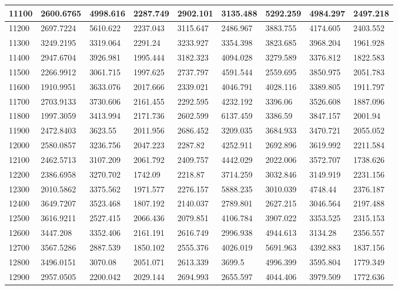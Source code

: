 \begin{table}[]
{\begin{tabular}{|l|l|l|l|l|l|l|l|l|}
11100 & 2600.6765 & 4998.616 & 2287.749 & 2902.101 & 3135.488 & 5292.259 & 4984.297 & 2497.218 \\ \hline
11200 & 2697.7224 & 5610.622 & 2237.043 & 3115.647 & 2486.967 & 3883.755 & 4174.605 & 2403.552 \\ \hline
11300 & 3249.2195 & 3319.064 & 2291.24 & 3233.927 & 3354.398 & 3823.685 & 3968.204 & 1961.928 \\ \hline
11400 & 2947.6704 & 3926.981 & 1995.444 & 3182.323 & 4094.028 & 3279.589 & 3376.812 & 1822.583 \\ \hline
11500 & 2266.9912 & 3061.715 & 1997.625 & 2737.797 & 4591.544 & 2559.695 & 3850.975 & 2051.783 \\ \hline
11600 & 1910.9951 & 3633.076 & 2017.666 & 2339.021 & 4046.791 & 4028.116 & 3389.805 & 1911.797 \\ \hline
11700 & 2703.9133 & 3730.606 & 2161.455 & 2292.595 & 4232.192 & 3396.06 & 3526.608 & 1887.096 \\ \hline
11800 & 1997.3059 & 3413.994 & 2171.736 & 2602.599 & 6137.459 & 3386.59 & 3847.157 & 2001.94 \\ \hline
11900 & 2472.8403 & 3623.55 & 2011.956 & 2686.452 & 3209.035 & 3684.933 & 3470.721 & 2055.052 \\  \hline
12000 & 2580.0857 & 3236.756 & 2047.223 & 2287.82 & 4252.911 & 2692.896 & 3619.992 & 2211.584 \\ \hline
12100 & 2462.5713 & 3107.209 & 2061.792 & 2409.757 & 4442.029 & 2022.006 & 3572.707 & 1738.626 \\ \hline
12200 & 2386.6958 & 3270.702 & 1742.09 & 2218.87 & 3714.259 & 3032.846 & 3149.919 & 2231.156 \\ \hline
12300 & 2010.5862 & 3375.562 & 1971.577 & 2276.157 & 5888.235 & 3010.039 & 4748.44 & 2376.187 \\ \hline
12400 & 3649.7207 & 3523.468 & 1807.192 & 2140.037 & 2789.801 & 2627.215 & 3046.564 & 2197.488 \\ \hline
12500 & 3616.9211 & 2527.415 & 2066.436 & 2079.851 & 4106.784 & 3907.022 & 3353.525 & 2315.153 \\ \hline
12600 & 3447.208 & 3352.406 & 2161.191 & 2616.749 & 2996.938 & 4944.613 & 3134.28 & 2356.557 \\ \hline
12700 & 3567.5286 & 2887.539 & 1850.102 & 2555.376 & 4026.019 & 5691.963 & 4392.883 & 1837.156 \\ \hline
12800 & 3496.0151 & 3070.08 & 2051.071 & 2613.339 & 3699.5 & 4996.399 & 3595.804 & 1779.349 \\ \hline
12900 & 2957.0505 & 2200.042 & 2029.144 & 2694.993 & 2655.597 & 4044.406 & 3979.509 & 1772.636 \\ \hline

\end{tabular}}
\end{table}
